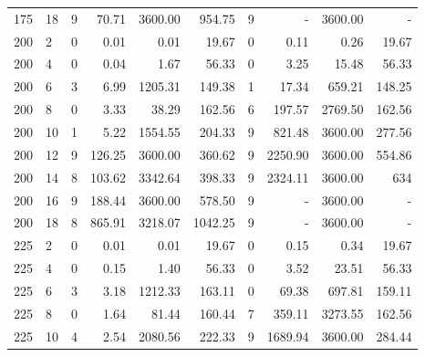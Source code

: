 \begin{appendices}
\begin{table*}[h]
\begin{center}
\begin{tabular} {l l | r r r r | r r r r}
175 & 18  &  9            &  70.71         &  3600.00     &  954.75    &  9           &  -               &  3600.00    &  -         \\ 
200 & 2   &  0            &  0.01          &  0.01        &  19.67     &  0           &  0.11            &  0.26       &  19.67     \\ 
200 & 4   &  0            &  0.04          &  1.67        &  56.33     &  0           &  3.25            &  15.48      &  56.33     \\ 
200 & 6   &  3            &  6.99          &  1205.31     &  149.38    &  1           &  17.34           &  659.21     &  148.25    \\ 
200 & 8   &  0            &  3.33          &  38.29       &  162.56    &  6           &  197.57          &  2769.50    &  162.56    \\ 
200 & 10  &  1            &  5.22          &  1554.55     &  204.33    &  9           &  821.48          &  3600.00    &  277.56    \\ 
200 & 12  &  9            &  126.25        &  3600.00     &  360.62    &  9           &  2250.90         &  3600.00    &  554.86    \\ 
200 & 14  &  8            &  103.62        &  3342.64     &  398.33    &  9           &  2324.11         &  3600.00    &  634       \\ 
200 & 16  &  9            &  188.44        &  3600.00     &  578.50    &  9           &  -               &  3600.00    &  -         \\ 
200 & 18  &  8            &  865.91        &  3218.07     &  1042.25   &  9           &  -               &  3600.00    &  -         \\ 
225 & 2   &  0            &  0.01          &  0.01        &  19.67     &  0           &  0.15            &  0.34       &  19.67     \\ 
225 & 4   &  0            &  0.15          &  1.40        &  56.33     &  0           &  3.52            &  23.51      &  56.33     \\ 
225 & 6   &  3            &  3.18          &  1212.33     &  163.11    &  0           &  69.38           &  697.81     &  159.11    \\ 
225 & 8   &  0            &  1.64          &  81.44       &  160.44    &  7           &  359.11          &  3273.55    &  162.56    \\ 
225 & 10  &  4            &  2.54          &  2080.56     &  222.33    &  9           &  1689.94         &  3600.00    &  284.44    \\ 

\end{tabular}
\end{center}
\end{table*}
\end{appendices}
